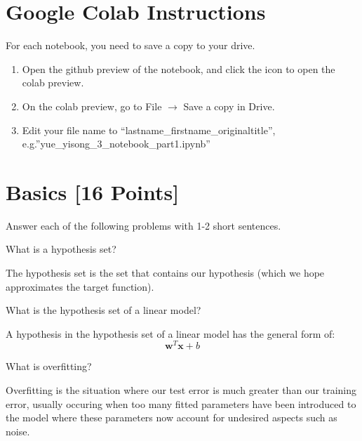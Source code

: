 \section*{Google Colab Instructions}

For each notebook, you need to save a copy to your drive.

\begin{enumerate}
	\item Open the github preview of the notebook, and click the icon to open the colab preview.
	\item On the colab preview, go to File $\rightarrow$ Save a copy in Drive.
	\item Edit your file name to “lastname_firstname_originaltitle”, e.g.”yue_yisong_3_notebook_part1.ipynb”
\end{enumerate}


\newpage
\section{Basics [16 Points]}

Answer each of the following problems with 1-2 short sentences.

\begin{problem}[2]
  What is a hypothesis set?
\end{problem}
\begin{solution}
  The hypothesis set is the set that contains our hypothesis (which we hope approximates the target function).
\end{solution}

\begin{problem}[2]
  What is the hypothesis set of a linear model?
\end{problem}
\begin{solution}
  A hypothesis in the hypothesis set of a linear model has the general form of:
  \begin{equation}
    \mathbf{w}^T\mathbf{x}+b
  \end{equation}
\end{solution}

\begin{problem}[2]
  What is overfitting?
\end{problem}
\begin{solution}
  Overfitting is the situation where our test error is much greater than our training error, usually occuring when too many fitted parameters have been introduced to the model where these parameters now account for undesired aspects such as noise.
\end{solution}

